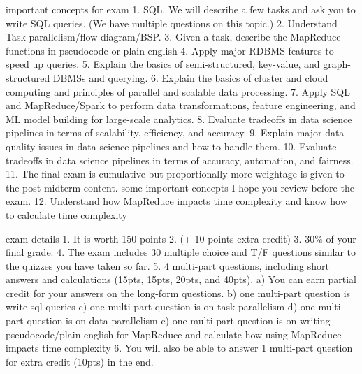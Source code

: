 important concepts for exam
  1. SQL. We will describe a few tasks and ask you to write SQL queries. (We have multiple questions on this topic.)
  2. Understand Task parallelism/flow diagram/BSP.
  3. Given a task, describe the MapReduce functions in pseudocode or plain english
  4. Apply major RDBMS features to speed up queries.
  5. Explain the basics of semi-structured, key-value, and graph-structured DBMSs and querying.
  6. Explain the basics of cluster and cloud computing and principles of parallel and scalable data processing.
  7. Apply SQL and MapReduce/Spark to perform data transformations, feature engineering, and ML model building for large-scale analytics.
  8. Evaluate tradeoffs in data science pipelines in terms of scalability, efficiency, and accuracy.
  9. Explain major data quality issues in data science pipelines and how to handle them.
  10. Evaluate tradeoffs in data science pipelines in terms of accuracy, automation, and fairness.
  11.  The final exam is cumulative but proportionally more weightage is given to the post-midterm content. 
  some important concepts I hope you review before the exam.
  12. Understand how MapReduce impacts time complexity and know how to calculate time complexity
  
exam details
  1. It is worth 150 points 
  2. (+ 10 points extra credit) 
  3. 30\% of your final grade. 
  4. The exam includes 30 multiple choice and T/F questions similar to the quizzes you have taken so far. 
  5. 4 multi-part questions, including short answers and calculations (15pts, 15pts, 20pts, and 40pts). 
    a) You can earn partial credit for your answers on the long-form questions. 
    b) one multi-part question is write sql queries 
    c) one multi-part question is on task parallelism
    d) one multi-part question is on data parallelism
    e) one multi-part question is on writing pseudocode/plain english for MapReduce and calculate how using MapReduce impacts time complexity
  6. You will also be able to answer 1 multi-part question for extra credit (10pts) in the end.
